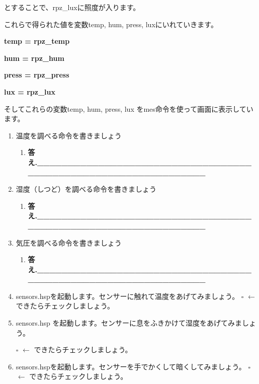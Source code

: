 \documentclass[a4paper,dvipdfmx]{jarticle}
\begin{document}
とすることで、rpz\_luxに照度が入ります。

これらで得られた値を変数temp, hum, press,
luxにいれていきます。

{\ttfamily\bfseries\color{black}
temp = rpz\_temp}

{\ttfamily\bfseries\color{black}
hum = rpz\_hum}

{\ttfamily\bfseries\color{black}
press = rpz\_press}

{\ttfamily\bfseries\color{black}
lux = rpz\_lux}


\bigskip

そしてこれらの変数temp, hum, press, lux
をmes命令を使って画面に表示しています。


\bigskip


\bigskip


\begin{enumerate}
\item 温度を調べる命令を書きましょう

\begin{enumerate}
\item[] 
\bigskip


\bigskip

{\ttfamily\bfseries
答え.\_\_\_\_\_\_\_\_\_\_\_\_\_\_\_\_\_\_\_\_\_\_\_\_\_\_\_\_\_\_\_\_\_\_\_\_\_\_\_\_\_\_\_\_\_\_\_\_\_\_\_\_\_\_\_\_\_\_\_\_\_\_\_\_}


\bigskip
\end{enumerate}
\item
湿度（しつど）を調べる命令を書きましょう

\begin{enumerate}
\item[] 
\bigskip

{\ttfamily\bfseries
答え.\_\_\_\_\_\_\_\_\_\_\_\_\_\_\_\_\_\_\_\_\_\_\_\_\_\_\_\_\_\_\_\_\_\_\_\_\_\_\_\_\_\_\_\_\_\_\_\_\_\_\_\_\_\_\_\_\_\_\_\_\_\_\_\_}
\end{enumerate}
\item 気圧を調べる命令を書きましょう

\begin{enumerate}
\item[] 
\bigskip


\bigskip

{\ttfamily\bfseries
答え.\_\_\_\_\_\_\_\_\_\_\_\_\_\_\_\_\_\_\_\_\_\_\_\_\_\_\_\_\_\_\_\_\_\_\_\_\_\_\_\_\_\_\_\_\_\_\_\_\_\_\_\_\_\_\_\_\_\_\_\_\_\_\_\_}
\end{enumerate}
\item
sensors.hspを起動します。センサーに触れて温度をあげてみましょう。\newline
${\square}$ $\leftarrow $
できたらチェックしましょう。
\item sensors.hsp
を起動します。センサーに息をふきかけて湿度をあげてみましょう。

${\square}$ $\leftarrow $
できたらチェックしましょう。
\item
sensors.hspを起動します。センサーを手でかくして暗くしてみましょう。\newline
${\square}$ $\leftarrow $
できたらチェックしましょう。
\end{enumerate}
\end{document}
